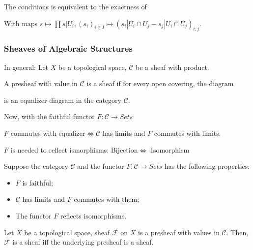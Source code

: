 \documentclass[Total.tex]{subfiles}
\begin{document}
				The conditions is equivalent to the exactness of
				
				\begin{center}
				\end{center}
				
				With maps $s\mapsto \prod s|U_i,(s_i)_{i\in I}\mapsto (s_{i}|U_{i}\cap U_{j}-s_j|U_i\cap U_j)_{i,j}$.
				
				\subsubsection{Sheaves of Algebraic Structures}
				
				\begin{Def}
					In general: Let $X$ be a topological space, $\mathcal{C}$ be a sheaf with product. 
					
					A presheaf with value in $\mathcal{C}$ is a sheaf if for every open covering, the diagram
					\begin{center}
					\end{center}
					is an equalizer diagram in the category $\mathcal{C}$.
				\end{Def}
				
				Now, with the faithful functor $F:\mathcal{C}\rightarrow Sets$
				\begin{center}
				\end{center}
				
				$F$ commutes with equalizer$\Leftrightarrow \mathcal{C}$ has limits and $F$ commutes with limits. 
				
				$F$ is needed to reflect ismorphisms: Bijection$\Leftrightarrow$ Isomorphism
				
				
				\begin{lemma}
					Suppose the category $\mathcal{C}$ and the functor $F:\mathcal{C}\rightarrow Sets$ has the following properties:
					\begin{itemize}
						\item $F$ is faithful;
						\item $\mathcal{C}$ has limits and $F$ commutes with them;
						\item The functor $F$ reflects isomorphisms.
					\end{itemize}
					Let $X$ be a topological space, sheaf $\mathcal{F}$ on $X$ is a presheaf with values in $\mathcal{C}$. Then, $\mathcal{F}$ is a sheaf iff the underlying presheaf is a sheaf.
				\end{lemma} 
				
\end{document}

